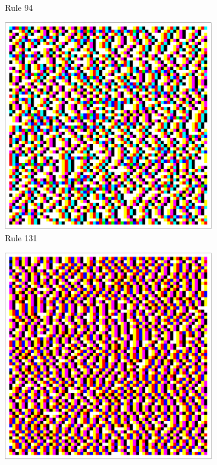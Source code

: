 \documentclass{article}
\begin{document}
\begin{figure}[H]
\begin{subfigure}[b]{0.135\textwidth}
        \vspace{-16pt}\caption*{Rule 94}
        \label{fig:rule-94-center_columns-4096}
    \end{subfigure}
    \begin{subfigure}[b]{0.135\textwidth}
        \centering
        \includegraphics[width=\textwidth]{graphics/behavior/center-columns/rule-131-center_columns-4096.pdf}
        \vspace{-16pt}\caption*{Rule 131}
        \label{fig:rule-131-center_columns-4096}
    \end{subfigure}
    \begin{subfigure}[b]{0.135\textwidth}
        \centering
        \includegraphics[width=\textwidth]{graphics/behavior/center-columns/rule-133-center_columns-4096.pdf}

\end{subfigure}
\end{figure}
\end{document}
